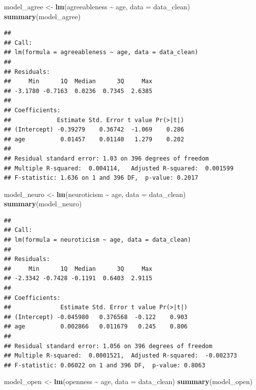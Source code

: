 \documentclass[
]{article}
\newenvironment{Shaded}{\begin{snugshade}}{\end{snugshade}}
\newcommand{\AttributeTok}[1]{\textcolor[rgb]{0.13,0.29,0.53}{#1}}
\newcommand{\FunctionTok}[1]{\textcolor[rgb]{0.13,0.29,0.53}{\textbf{#1}}}
\newcommand{\NormalTok}[1]{#1}
\newcommand{\OtherTok}[1]{\textcolor[rgb]{0.56,0.35,0.01}{#1}}
\newcommand{\SpecialCharTok}[1]{\textcolor[rgb]{0.81,0.36,0.00}{\textbf{#1}}}
\begin{document}
\begin{Shaded}
\begin{Highlighting}[]
\NormalTok{model\_agree }\OtherTok{\textless{}{-}} \FunctionTok{lm}\NormalTok{(agreeableness }\SpecialCharTok{\textasciitilde{}}\NormalTok{ age, }\AttributeTok{data =}\NormalTok{ data\_clean)}
\FunctionTok{summary}\NormalTok{(model\_agree)}
\end{Highlighting}
\end{Shaded}

\begin{verbatim}
## 
## Call:
## lm(formula = agreeableness ~ age, data = data_clean)
## 
## Residuals:
##     Min      1Q  Median      3Q     Max 
## -3.1780 -0.7163  0.0236  0.7345  2.6385 
## 
## Coefficients:
##             Estimate Std. Error t value Pr(>|t|)
## (Intercept) -0.39279    0.36742  -1.069    0.286
## age          0.01457    0.01140   1.279    0.202
## 
## Residual standard error: 1.03 on 396 degrees of freedom
## Multiple R-squared:  0.004114,   Adjusted R-squared:  0.001599 
## F-statistic: 1.636 on 1 and 396 DF,  p-value: 0.2017
\end{verbatim}

\begin{Shaded}
\begin{Highlighting}[]
\NormalTok{model\_neuro }\OtherTok{\textless{}{-}} \FunctionTok{lm}\NormalTok{(neuroticism }\SpecialCharTok{\textasciitilde{}}\NormalTok{ age, }\AttributeTok{data =}\NormalTok{ data\_clean)}
\FunctionTok{summary}\NormalTok{(model\_neuro)}
\end{Highlighting}
\end{Shaded}

\begin{verbatim}
## 
## Call:
## lm(formula = neuroticism ~ age, data = data_clean)
## 
## Residuals:
##     Min      1Q  Median      3Q     Max 
## -2.3342 -0.7428 -0.1191  0.6403  2.9115 
## 
## Coefficients:
##              Estimate Std. Error t value Pr(>|t|)
## (Intercept) -0.045980   0.376568  -0.122    0.903
## age          0.002866   0.011679   0.245    0.806
## 
## Residual standard error: 1.056 on 396 degrees of freedom
## Multiple R-squared:  0.0001521,  Adjusted R-squared:  -0.002373 
## F-statistic: 0.06022 on 1 and 396 DF,  p-value: 0.8063
\end{verbatim}

\begin{Shaded}
\begin{Highlighting}[]
\NormalTok{model\_open }\OtherTok{\textless{}{-}} \FunctionTok{lm}\NormalTok{(openness }\SpecialCharTok{\textasciitilde{}}\NormalTok{ age, }\AttributeTok{data =}\NormalTok{ data\_clean)}
\FunctionTok{summary}\NormalTok{(model\_open)}
\end{Highlighting}
\end{Shaded}
\end{document}
